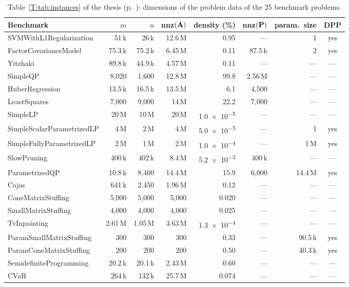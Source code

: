 \documentclass[letterpaper,12pt]{article}
\newcommand{\ac}[1]{#1}
\newcommand{\tpage}[1]{p.~\pageref{T-#1}}
\begin{document}
\begin{table}[htbp]
\centering
\caption{Table~\ref{T-tab:instances} of the thesis (\tpage{tab:instances}): dimensions of the problem data
of the $25$ benchmark problems.}\label{tab:new-dims}
{\small
\setlength{\tabcolsep}{4pt}
\begin{tabular}{l rrrr rrc}
\toprule
Benchmark & $m$ & $n$ & nnz$(\mathbf{A})$ & density (\%) & nnz$(\mathbf{P})$ & param.\ size & \ac{DPP} \\
\midrule
SVMWithL1Regularization & 51\,k & 26\,k & 12.6\,M & 0.95 & --- & 1 & yes \\
FactorCovarianceModel & 75.3\,k & 75.2\,k & 6.45\,M & 0.11 & 87.5\,k & 2 & yes \\
Yitzhaki & 89.8\,k & 44.9\,k & 4.57\,M & 0.11 & --- & --- & --- \\
SimpleQP & 8{,}020 & 1{,}600 & 12.8\,M & 99.8 & 2.56\,M & --- & --- \\
HuberRegression & 13.5\,k & 16.5\,k & 13.5\,M & 6.1 & 4{,}500 & --- & --- \\
LeastSquares & 7{,}000 & 9{,}000 & 14\,M & 22.2 & 7{,}000 & --- & --- \\
SimpleLP & 20\,M & 10\,M & 20\,M & \num{1.0e-5} & --- & --- & --- \\
SimpleScalarParametrizedLP & 4\,M & 2\,M & 4\,M & \num{5.0e-5} & --- & 1 & yes \\
SimpleFullyParametrizedLP & 2\,M & 1\,M & 2\,M & \num{1.0e-4} & --- & 1\,M & yes \\
SlowPruning & 400\,k & 402\,k & 8.4\,M & \num{5.2e-3} & 400\,k & --- & --- \\
ParametrizedQP & 10.8\,k & 8{,}400 & 14.4\,M & 15.9 & 6{,}000 & 14.4\,M & yes \\
Cajas & 641\,k & 2{,}450 & 1.96\,M & 0.12 & --- & --- & --- \\
ConeMatrixStuffing & 5{,}000 & 5{,}000 & 5{,}000 & 0.020 & --- & --- & --- \\
SmallMatrixStuffing & 4{,}000 & 4{,}000 & 4{,}000 & 0.025 & --- & --- & --- \\
TvInpainting & 2.61\,M & 1.05\,M & 3.63\,M & \num{1.3e-4} & --- & --- & --- \\
ParamSmallMatrixStuffing & 300 & 300 & 300 & 0.33 & --- & 90.5\,k & yes \\
ParamConeMatrixStuffing & 200 & 200 & 200 & 0.50 & --- & 40.3\,k & yes \\
SemidefiniteProgramming & 20.2\,k & 20.1\,k & 2.43\,M & 0.60 & --- & --- & --- \\
CVaR & 264\,k & 132\,k & 25.7\,M & 0.074 & --- & --- & --- \\

\end{tabular}}
\end{table}
\end{document}
